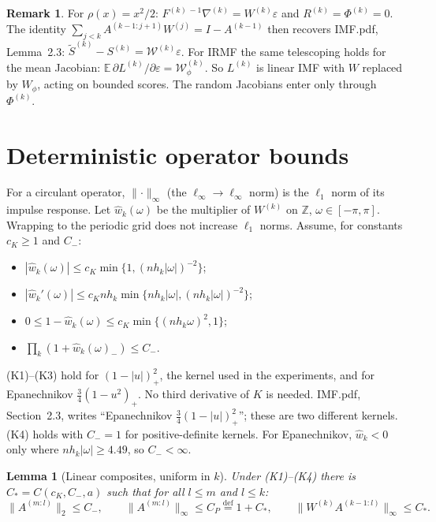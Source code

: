 \documentclass[11pt]{article}
\newcommand{\E}{\mathbb{E}}
\newcommand{\Z}{\mathbb{Z}}
\newcommand{\defeq}{\stackrel{\mathrm{def}}{=}}
\newcommand{\norm}[1]{\lVert#1\rVert}
\newcommand{\IMFt}{\widetilde S}
\newcommand{\Wcal}{\mathcal W}
\newtheorem{lemma}[proposition]{Lemma}
\theoremstyle{definition}
\newtheorem*{remark}{Remark}
\begin{document}
\begin{remark}
For \(\rho(x)=x^2/2\): \(F^{(k)\,-1}\nabla^{(k)}=W^{(k)}\varepsilon\) and
\(R^{(k)}=\Phi^{(k)}=0\).  The identity
\(\sum_{j<k}A^{(k-1:j+1)}W^{(j)}=I-A^{(k-1)}\) then recovers IMF.pdf,
Lemma~2.3: \(\IMFt^{(k)}-S^{(k)}=\Wcal^{(k)}\varepsilon\).  For IRMF the same
telescoping holds for the mean Jacobian:
\(\E\,\partial L^{(k)}/\partial\varepsilon=\Wcal^{(k)}_\phi\).  So
\(L^{(k)}\) is linear IMF with \(W\) replaced by \(W_\phi\), acting on bounded
scores.  The random Jacobians enter only through \(\Phi^{(k)}\).
\end{remark}

\section{Deterministic operator bounds}

For a circulant operator, \(\norm\cdot_\infty\) (the
\(\ell_\infty\to\ell_\infty\) norm) is the \(\ell_1\) norm of its impulse
response.  Let \(\hat w_k(\omega)\) be the multiplier of \(W^{(k)}\) on
\(\Z\), \(\omega\in[-\pi,\pi]\).  Wrapping to the periodic grid does not
increase \(\ell_1\) norms.  Assume, for constants \(c_K\ge1\) and \(C_-\):
\begin{itemize}
\item[(K1)] \(|\hat w_k(\omega)|\le c_K\min\{1,(nh_k|\omega|)^{-2}\}\);
\item[(K2)] \(|\hat w_k'(\omega)|\le c_Knh_k\min\{nh_k|\omega|,(nh_k|\omega|)^{-2}\}\);
\item[(K3)] \(0\le1-\hat w_k(\omega)\le c_K\min\{(nh_k\omega)^2,1\}\);
\item[(K4)] \(\prod_k(1+\hat w_k(\omega)_-)\le C_-\).
\end{itemize}
(K1)--(K3) hold for \((1-|u|)_+^2\), the kernel used in the experiments,
and for Epanechnikov \(\tfrac34(1-u^2)_+\).  No third derivative of \(K\)
is needed.  IMF.pdf, Section~2.3, writes ``Epanechnikov
\(\tfrac34(1-|u|)^2_+\)''; these are two different kernels.  (K4) holds with
\(C_-=1\) for positive-definite kernels.  For Epanechnikov, \(\hat w_k<0\)
only where \(nh_k|\omega|\ge4.49\), so \(C_-<\infty\).

\begin{lemma}[Linear composites, uniform in \(k\)]\label{lem:linear}
Under (K1)--(K4) there is \(C_*=C(c_K,C_-,a)\) such that for all
\(l\le m\) and \(l\le k\):
\[
  \norm{A^{(m:l)}}_2\le C_-,\qquad
  \norm{A^{(m:l)}}_\infty\le C_P\defeq1+C_*,\qquad
  \norm{W^{(k)}A^{(k-1:l)}}_\infty\le C_* .
\]
\end{lemma}
\end{document}
